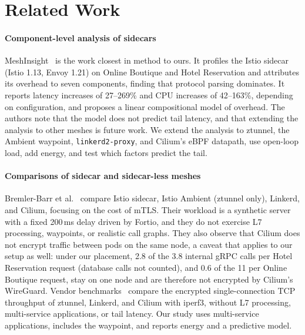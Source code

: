 \section{Related Work}
\label{sec:related}

\paragraph{Component-level analysis of sidecars}
MeshInsight~\cite{zhu2023meshinsight} is the work closest in method to ours.
It profiles the Istio sidecar (Istio 1.13, Envoy 1.21) on Online Boutique and
Hotel Reservation and attributes its overhead to seven components, finding that
protocol parsing dominates. It reports latency increases of 27--269\% and CPU
increases of 42--163\%, depending on configuration, and proposes a linear
compositional model of overhead. The authors note that the model does not
predict tail latency, and that extending the analysis to other meshes is future
work. We extend the analysis to ztunnel, the Ambient waypoint,
\texttt{linkerd2-proxy}, and Cilium's eBPF datapath, use open-loop load, add
energy, and test which factors predict the tail.

\paragraph{Comparisons of sidecar and sidecar-less meshes}
Bremler-Barr et al.~\cite{bremlerbarr2024mtls} compare Istio sidecar, Istio
Ambient (ztunnel only), Linkerd, and Cilium, focusing on the cost of mTLS. Their
workload is a synthetic server with a fixed 200\,ms delay driven by Fortio, and
they do not exercise L7 processing, waypoints, or realistic call graphs. They
also observe that Cilium does not encrypt traffic between pods on the same node,
a caveat that applies to our setup as well: under our placement, 2.8 of the
3.8 internal gRPC calls per Hotel Reservation request (database calls not
counted), and 0.6 of the 11 per Online
Boutique request, stay on one node and are therefore not encrypted by Cilium's
WireGuard. Vendor benchmarks~\cite{istio2025ambientperf} compare the
encrypted single-connection TCP throughput of ztunnel, Linkerd, and Cilium with
iperf3, without L7 processing, multi-service applications, or tail latency.
Our study uses multi-service
applications, includes the waypoint, and reports energy and a predictive model.

